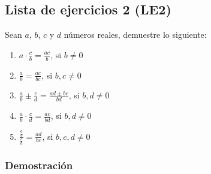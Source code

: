 \documentclass[11pt]{article}
\begin{document}

\subsection*{Lista de ejercicios 2 (LE2)}

Sean $a$, $b$, $c$ y $d$ números reales, demuestre lo siguiente:

\begin{enumerate}[label=\alph*),font=\bfseries]
    \item $a \cdot \frac{c}{b} = \frac{ac}{b}$, si $b \neq 0$
    \item $\frac{a}{b} = \frac{ac}{bc}$, si $b,c \neq 0$
    \item $\frac{a}{b} \pm \frac{c}{d} = \frac{ad \pm bc}{bd} $, si $b, d \neq 0$
    \item $\frac{a}{b} \cdot \frac{c}{d} = \frac{ac}{bd}$, si $b, d \neq 0$
    \item $\frac{\frac{a}{b}}{\frac{c}{d}} = \frac{ad}{bc}$, si $b, c, d \neq 0$
\end{enumerate}

\subsubsection*{Demostración}
\end{document}
